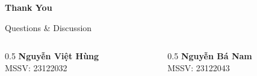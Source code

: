 \documentclass{beamer}
\begin{document}
\begin{frame}{}
  \vspace{2.5em}
  \centering
  {\LARGE \textbf{Thank You}}

  \vspace{1.5em}
  {\large Questions \& Discussion}

  \vspace{2em}
  \begin{columns}
    \begin{column}{0.5\textwidth}
      \centering\small
      \textbf{Nguy\~{\^e}n Vi\d{\^e}t H\`ung}\\
      MSSV: 23122032
    \end{column}
    \begin{column}{0.5\textwidth}
      \centering\small
      \textbf{Nguy\~{\^e}n B\'a Nam}\\
      MSSV: 23122043
    \end{column}
  \end{columns}
\end{frame}
\end{document}
